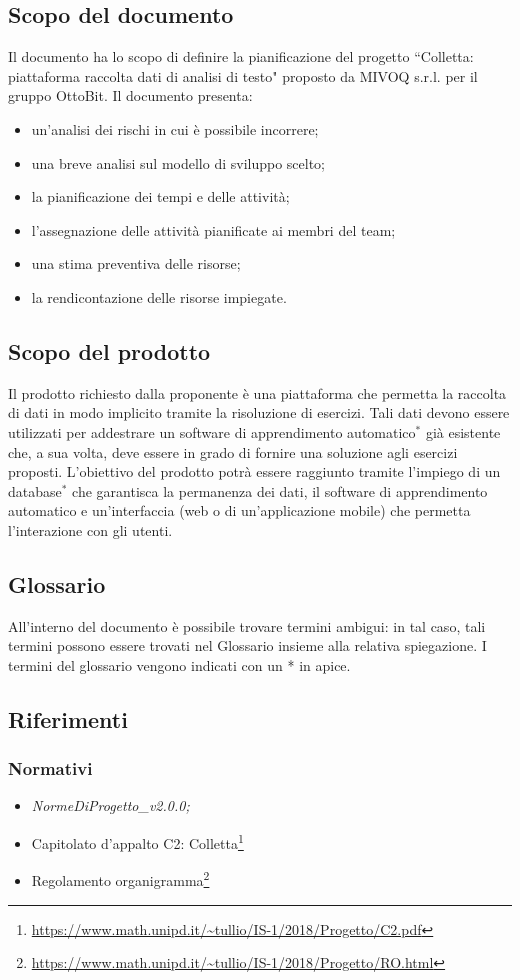 \subsection{Scopo del documento}
	Il documento ha lo scopo di definire la pianificazione del progetto ``Colletta: piattaforma raccolta dati di analisi di testo" proposto da MIVOQ s.r.l. per il gruppo OttoBit. Il documento presenta:
	\begin{itemize}
		\item un'analisi dei rischi in cui è possibile incorrere;
		\item una breve analisi sul modello di sviluppo scelto;
		\item la pianificazione dei tempi e delle attività;
		\item l'assegnazione delle attività pianificate ai membri del team;
		\item una stima preventiva delle risorse;
		\item la rendicontazione delle risorse impiegate.
	\end{itemize}

\subsection{Scopo del prodotto}
	Il prodotto richiesto dalla proponente è una piattaforma che permetta la raccolta di dati in modo implicito tramite la risoluzione di esercizi. Tali dati devono essere utilizzati per addestrare un software di apprendimento automatico$^*$ già esistente che, a sua volta, deve essere in grado di fornire una soluzione agli esercizi proposti. L'obiettivo del prodotto potrà essere raggiunto tramite l'impiego di un database$^*$ che garantisca la permanenza dei dati, il software di apprendimento automatico e un'interfaccia (web o di un'applicazione mobile) che permetta l'interazione con gli utenti.

\subsection{Glossario}
	All'interno del documento è possibile trovare termini ambigui: in tal caso, tali termini possono essere trovati nel Glossario insieme alla relativa spiegazione. I termini del glossario vengono indicati con un * in apice.
	
\subsection{Riferimenti}
	\subsubsection{Normativi}
		\begin{itemize}
			\item \textit{NormeDiProgetto\_v2.0.0;}
			\item Capitolato d'appalto C2: Colletta\footnote{\url{https://www.math.unipd.it/~tullio/IS-1/2018/Progetto/C2.pdf}}
			\item Regolamento organigramma\footnote{\url{https://www.math.unipd.it/~tullio/IS-1/2018/Progetto/RO.html}}
		\end{itemize}
